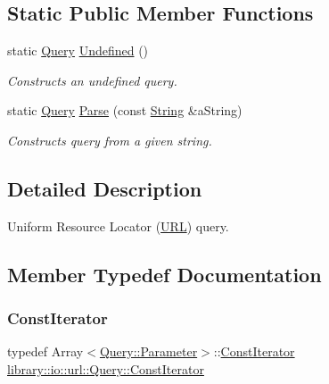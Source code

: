\subsection*{Static Public Member Functions}
\begin{DoxyCompactItemize}
\item 
static \hyperlink{classlibrary_1_1io_1_1url_1_1_query}{Query} \hyperlink{classlibrary_1_1io_1_1url_1_1_query_acea48a0bfba96773f6db11d1a904a520}{Undefined} ()
\begin{DoxyCompactList}\small\item\em Constructs an undefined query. \end{DoxyCompactList}\item 
static \hyperlink{classlibrary_1_1io_1_1url_1_1_query}{Query} \hyperlink{classlibrary_1_1io_1_1url_1_1_query_a52a7b884fbf52bb9bc449e5f314c3199}{Parse} (const \hyperlink{namespacelibrary_1_1io_a7469b45835a4421045db344d6a5a1f85}{String} \&a\+String)
\begin{DoxyCompactList}\small\item\em Constructs query from a given string. \end{DoxyCompactList}\end{DoxyCompactItemize}


\subsection{Detailed Description}
Uniform Resource Locator (\hyperlink{classlibrary_1_1io_1_1_u_r_l}{U\+RL}) query. 

\subsection{Member Typedef Documentation}
\mbox{\label{classlibrary_1_1io_1_1url_1_1_query_a244b3517cf5a3d1abf7e8c8d9d40cf04}} 
\subsubsection{\texorpdfstring{Const\+Iterator}{ConstIterator}}
{\footnotesize\ttfamily typedef Array$<$\hyperlink{classlibrary_1_1io_1_1url_1_1_query_1_1_parameter}{Query\+::\+Parameter}$>$\+::\hyperlink{classlibrary_1_1io_1_1url_1_1_query_a244b3517cf5a3d1abf7e8c8d9d40cf04}{Const\+Iterator} \hyperlink{classlibrary_1_1io_1_1url_1_1_query_a244b3517cf5a3d1abf7e8c8d9d40cf04}{library\+::io\+::url\+::\+Query\+::\+Const\+Iterator}}



